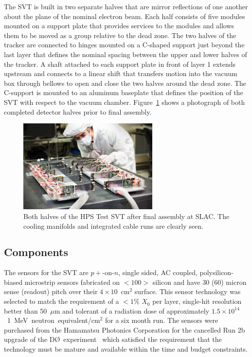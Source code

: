 \documentclass[final,3p,times,twocolumn]{elsarticle}
\newcommand{\fluenceunit}{1~MeV~neutron~equivalent/cm\ensuremath{^2}}
\begin{document}
The SVT is built in two separate halves that are mirror reflections of one another about the plane of 
the nominal electron beam.  Each half consists of five modules mounted on a support plate that 
provides services to the modules and allows them to be moved as a group relative to the dead zone. 
The two halves of the tracker are connected to hinges mounted on a C-shaped support just beyond 
the last layer that defines the nominal spacing between the upper and lower halves of the tracker.  A 
shaft attached to each support plate in front of layer 1 extends upstream and connects to a linear shift 
that transfers motion into the vacuum box through bellows to open and close the two halves around 
the dead zone. The C-support is mounted to an aluminum baseplate that defines the position of the 
SVT with respect to the vacuum chamber. Figure~\ref{fig:tracker_halves} shows a photograph of both 
completed detector halves prior to final assembly. 
\begin{figure}[htp]
\begin{center}
    \includegraphics[width=7cm]{figures/2012-101-PHOTON-DETECTOR-001}
\caption{\small{Both halves of the HPS Test SVT after final assembly at SLAC.  The cooling manifolds and 
integrated cable runs are clearly seen.} }
\label{fig:tracker_halves}
\end{center}
\end{figure}

\subsection{Components}
The sensors for the SVT are $p+$-on-$n$, single sided, AC coupled, polysilicon-biased microstrip 
sensors fabricated on $<100>$ silicon and have 30 (60) micron sense (readout) pitch over their 
$4\times10$~cm$^2$ surface. This sensor technology was selected to match the requirement of 
a $<1$\% $X_0$ per layer, single-hit resolution better than 50~$\mu$m and tolerant of a radiation 
dose of approximately $1.5\times10^{14}$~\fluenceunit{} for a six month run. The sensors 
were purchased from the Hamamatsu Photonics Corporation for the cancelled 
Run 2b upgrade of the D\O~experiment~\cite{Denisov:2001aa} which satisfied the requirement that 
the technology must be mature and available within the time and budget constraints.
\end{document}
